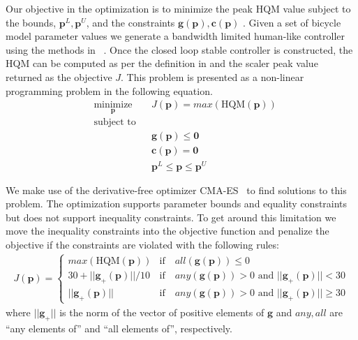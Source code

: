 \documentclass{bmd2019a}
\begin{document}
Our objective in the optimization is to minimize the peak HQM value subject to
the bounds, $\mathbf{p}^L,\mathbf{p}^U$, and the constraints
$\mathbf{g}(\mathbf{p}),\mathbf{c}(\mathbf{p})$ . Given a set of bicycle model
parameter values we generate a bandwidth limited human-like controller using
the methods in ~\cite{Moore2012}. Once the closed loop stable controller is
constructed, the HQM can be computed as per the definition in \cite{Hess2012}
and the scaler peak value returned as the objective $J$. This problem is
presented as a non-linear programming problem in the following equation.
%
\begin{equation}
  \begin{aligned}
    & \underset{\mathbf{p}}{\text{minimize}} & & J(\mathbf{p})=max(\textrm{HQM}(\mathbf{p})) \\
    & \text{subject to} & & \\
    & & & \mathbf{g}(\mathbf{p}) \leq \mathbf{0} \\
    & & & \mathbf{c}(\mathbf{p}) = \mathbf{0} \\
    & & & \mathbf{p}^L \leq \mathbf{p} \leq \mathbf{p}^U
  \end{aligned}
\end{equation}

We make use of the derivative-free optimizer CMA-ES~\cite{Hansen1996} to find
solutions to this problem. The optimization supports parameter bounds and
equality constraints but does not support inequality constraints. To get around
this limitation we move the inequality constraints into the objective function
and penalize the objective if the constraints are violated with the following
rules:
%
\begin{align}
  J(\mathbf{p}) =
  \begin{cases}
    max(\textrm{HQM}(\mathbf{p})) & \textrm{if} \quad all(\mathbf{g}(\mathbf{p})) \leq 0 \\
    30 + ||\mathbf{g}_{+}(\mathbf{p})||/10 & \textrm{if} \quad
      any(\mathbf{g}(\mathbf{p})) > 0 \textrm{ and } ||\mathbf{g}_{+}(\mathbf{p})|| < 30 \\
    ||\mathbf{g}_{+}(\mathbf{p})|| & \textrm{if} \quad
      any(\mathbf{g}(\mathbf{p})) > 0 \textrm{ and } ||\mathbf{g}_{+}(\mathbf{p})|| \geq 30
  \end{cases}
\end{align}
where $||\mathbf{g}_{+}||$ is the norm of the vector of positive elements of
$\mathbf{g}$ and $any,all$ are ``any elements of'' and ``all elements of'',
respectively.
\end{document}
